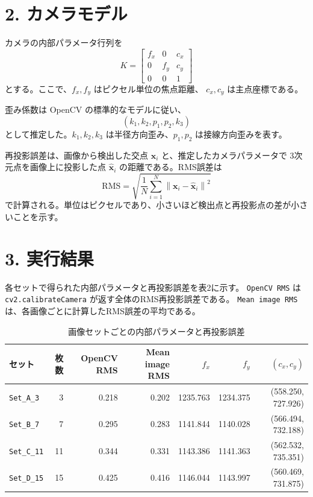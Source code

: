 \documentclass[11pt,a4paper]{ltjsarticle}
\begin{document}
\section*{2. カメラモデル}

カメラの内部パラメータ行列を
\[
K =
\begin{bmatrix}
f_x & 0 & c_x \\
0 & f_y & c_y \\
0 & 0 & 1
\end{bmatrix}
\]
とする。ここで、$f_x,f_y$ はピクセル単位の焦点距離、
$c_x,c_y$ は主点座標である。

歪み係数は OpenCV の標準的なモデルに従い、
\[
(k_1,k_2,p_1,p_2,k_3)
\]
として推定した。$k_1,k_2,k_3$ は半径方向歪み、$p_1,p_2$ は接線方向歪みを表す。

再投影誤差は、画像から検出した交点 $\mathbf{x}_i$ と、推定したカメラパラメータで
3次元点を画像上に投影した点 $\hat{\mathbf{x}}_i$ の距離である。RMS誤差は
\[
\mathrm{RMS}
=
\sqrt{
\frac{1}{N}
\sum_{i=1}^{N}
\left\|
\mathbf{x}_i-\hat{\mathbf{x}}_i
\right\|^2
}
\]
で計算される。単位はピクセルであり、小さいほど検出点と再投影点の差が小さいことを示す。

\section*{3. 実行結果}

各セットで得られた内部パラメータと再投影誤差を表2に示す。
\texttt{OpenCV RMS} は \texttt{cv2.calibrateCamera} が返す全体のRMS再投影誤差である。
\texttt{Mean image RMS} は、各画像ごとに計算したRMS誤差の平均である。

\begin{table}[H]
\centering
\caption{画像セットごとの内部パラメータと再投影誤差}
\small
\begin{tabular}{lrrrrrr}
\toprule
セット & 枚数 & OpenCV RMS & Mean image RMS & $f_x$ & $f_y$ & $(c_x,c_y)$ \\
\midrule
\texttt{Set\_A\_3}  & 3  & 0.218 & 0.202 & 1235.763 & 1234.375 & (558.250, 727.926) \\
\texttt{Set\_B\_7}  & 7  & 0.295 & 0.283 & 1141.844 & 1140.028 & (566.494, 732.188) \\
\texttt{Set\_C\_11} & 11 & 0.344 & 0.331 & 1143.386 & 1141.363 & (562.532, 735.351) \\
\texttt{Set\_D\_15} & 15 & 0.425 & 0.416 & 1146.044 & 1143.997 & (560.469, 731.875) \\
\bottomrule
\end{tabular}
\end{table}
\end{document}
